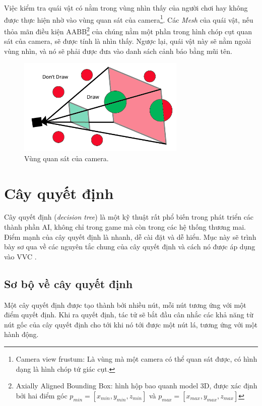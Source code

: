 \documentclass[12pt]{report}
\newcommand{\project}{VVC }
\begin{document}
Việc kiểm tra quái vật có nằm trong vùng nhìn thấy của người chơi hay không được thực hiện nhờ vào vùng quan sát của camera\footnote{Camera view frustum: Là vùng mà một camera có thể quan sát được, có hình dạng là hình chóp tứ giác cụt.}. Các \textit{Mesh} của quái vật, nếu thỏa mãn điều kiện AABB\footnote{Axially Aligned Bounding Box: hình hộp bao quanh model 3D, được xác định bởi hai điểm góc $p_{min} = [x_{min}, y_{min}, z_{min}]$ và $p_{max} = [x_{max}, y_{max}, z_{max}]$} của chúng nằm một phần trong hình chóp cụt quan sát của camera, sẽ được tính là nhìn thấy. Ngược lại, quái vật này sẽ nằm ngoài vùng nhìn, và nó sẽ phải được đưa vào danh sách cảnh báo bằng mũi tên.
\begin{figure}[H]
  \centering
    \includegraphics[width=8cm]{Pics/Chap5/camerafrustum.png}
  \caption{Vùng quan sát của camera.}
\end{figure}

\section{Cây quyết định}
\label{sec:decisiontree}
Cây quyết định (\textit{decision tree}) là một kỹ thuật rất phổ biến trong phát triển các thành phần AI, không chỉ trong game mà còn trong các hệ thống thương mai. Điểm mạnh của cây quyết định là nhanh, dễ cài đặt và dễ hiểu\cite{aiforgames}. Mục này sẽ trình bày sơ qua về các nguyên tắc chung của cây quyết định và cách nó được áp dụng vào \project.

\subsection{Sơ bộ về cây quyết định}
Một cây quyết định được tạo thành bởi nhiều nút, mỗi nút tương ứng với một điểm quyết định. Khi ra quyết định, tác tử sẽ bắt đầu cân nhắc các khả năng từ nút gốc của cây quyết định cho tới khi nó tới được một nút lá, tương ứng với một hành động.
\end{document}
